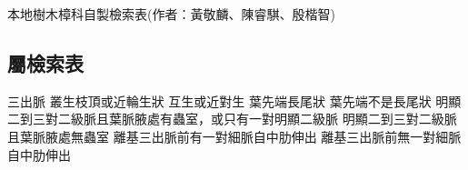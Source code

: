 \documentclass[12pt,a4paper]{article}
\begin{document}
\large 本地樹木樟科自製檢索表(作者：黃敬麟、陳睿騏、殷楷智)\\
\vspace{2ex}
\normalsize


\subsection*{屬檢索表}
\begin{Key*}{}
\indent\alter 三出脈
    \alter 叢生枝頂或近輪生狀
    \alter 互生或近對生
        \alter 葉先端長尾狀
        \alter 葉先端不是長尾狀
            \alter 明顯二到三對二級脈且葉脈腋處有蟲室，或只有一對明顯二級脈
            \alter 明顯二到三對二級脈且葉脈腋處無蟲室
                \alter 離基三出脈前有一對細脈自中肋伸出
                \alter 離基三出脈前無一對細脈自中肋伸出
            

\end{Key*}
\end{document}
